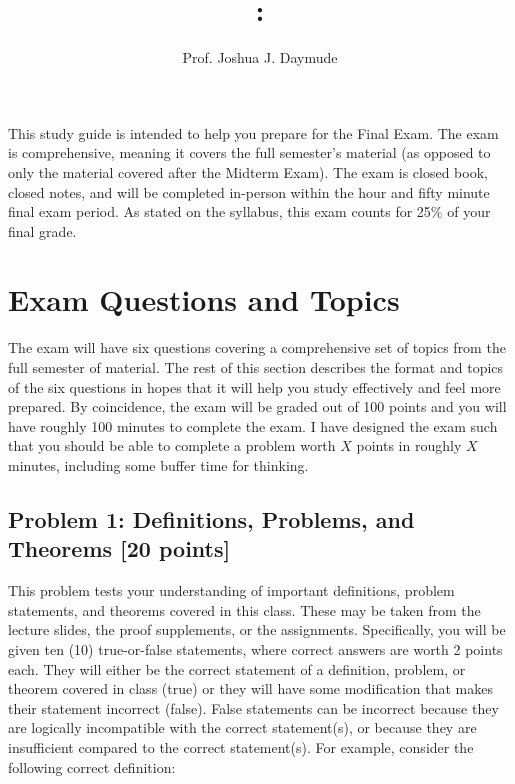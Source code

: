 \documentclass[10pt]{article}
\title{\large{\textbf{\course: \docname}}}
\author{Prof. Joshua J. Daymude}
\date{}
\begin{document}
\maketitle




This study guide is intended to help you prepare for the Final Exam.
The exam is comprehensive, meaning it covers the full semester's material (as opposed to only the material covered after the Midterm Exam).
The exam is closed book, closed notes, and will be completed in-person within the hour and fifty minute final exam period.
As stated on the syllabus, this exam counts for 25\% of your final grade.




\section{Exam Questions and Topics}

The exam will have six questions covering a comprehensive set of topics from the full semester of material.
The rest of this section describes the format and topics of the six questions in hopes that it will help you study effectively and feel more prepared.
By coincidence, the exam will be graded out of 100 points and you will have roughly 100 minutes to complete the exam.
I have designed the exam such that you should be able to complete a problem worth $X$ points in roughly $X$ minutes, including some buffer time for thinking.



\subsection{Problem 1: Definitions, Problems, and Theorems [20 points]}

This problem tests your understanding of important definitions, problem statements, and theorems covered in this class.
These may be taken from the lecture slides, the proof supplements, or the assignments.
Specifically, you will be given ten (10) true-or-false statements, where correct answers are worth 2 points each.
They will either be the correct statement of a definition, problem, or theorem covered in class (true) or they will have some modification that makes their statement incorrect (false).
False statements can be incorrect because they are logically incompatible with the correct statement(s), or because they are insufficient compared to the correct statement(s).
For example, consider the following correct definition:
\end{document}
